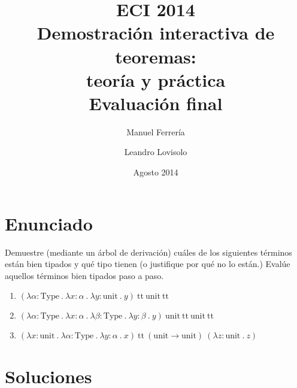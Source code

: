 \documentclass[a4paper]{article}
\newcommand{\Type}{\text{Type}}
\newcommand{\TT}{\text{tt}}
\newcommand{\Unit}{\text{unit}}
\begin{document}
\title{ECI 2014\\
       Demostración interactiva de teoremas:\\
       teoría y práctica\\[0.5\baselineskip]
       Evaluación final}
\author{Manuel Ferrería \and Leandro Lovisolo}
\date{Agosto 2014}
\maketitle




\section{Enunciado}

Demuestre (mediante un árbol de derivación) cuáles de los siguientes términos están bien tipados y qué tipo tienen (o justifique por qué no lo están.) Evalúe aquellos términos bien tipados paso a paso.

\begin{enumerate}
\item $(\lambda \alpha : \Type\ .\
        \lambda x : \alpha\ .\
        \lambda y : \Unit\ .\
        y)\
       \TT\ \Unit\ \TT$

\item $(\lambda \alpha : \Type\ .\
        \lambda x : \alpha\ .\
        \lambda \beta : \Type\ .\
        \lambda y : \beta\ .\
        y)\
       \Unit\ \TT\ \Unit\ \TT$
       
\item $(\lambda x : \Unit\ .\
        \lambda \alpha : \Type\ .\
        \lambda y : \alpha\ .\
        x)\
       \TT\ (\Unit \rightarrow \Unit)\
       (\lambda z : \Unit\ .\ z)$
\end{enumerate}




\section{Soluciones}
\end{document}
